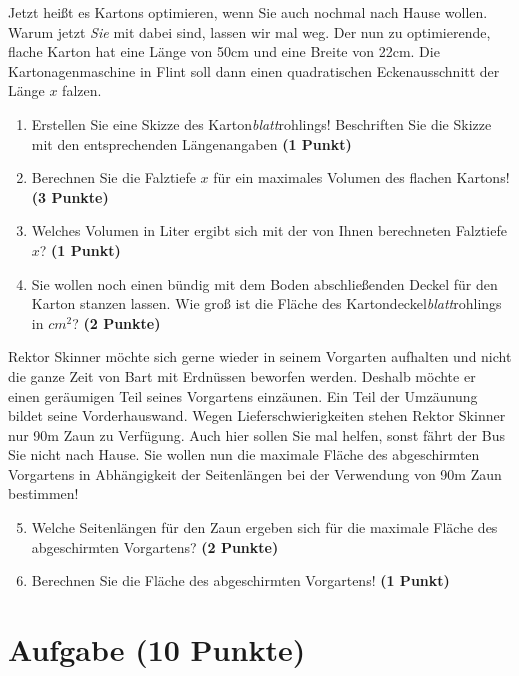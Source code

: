 \documentclass[a4paper, 9pt]{scrartcl}\usepackage[]{graphicx}\usepackage[]{xcolor}
\begin{document}
Jetzt heißt es Kartons optimieren, wenn Sie auch nochmal nach Hause wollen. Warum jetzt \textit{Sie} mit dabei sind, lassen wir mal weg. Der nun zu optimierende, flache Karton hat eine Länge von 50cm und eine Breite von 22cm. Die Kartonagenmaschine in Flint soll dann einen quadratischen Eckenausschnitt der Länge $x$ falzen.

\begin{enumerate}
\item Erstellen Sie eine Skizze des Karton\textit{blatt}rohlings! Beschriften Sie die Skizze mit den entsprechenden Längenangaben \textbf{(1 Punkt)}
\item Berechnen Sie die Falztiefe $x$ für ein maximales Volumen des flachen Kartons! \textbf{(3 Punkte)}
\item Welches Volumen in Liter ergibt sich mit der von Ihnen berechneten Falztiefe $x$?  \textbf{(1 Punkt)}
\item Sie wollen noch einen bündig mit dem Boden abschließenden Deckel für den Karton stanzen lassen. Wie groß ist die Fläche des Kartondeckel\textit{blatt}rohlings in $cm^2$? \textbf{(2 Punkte)}
\end{enumerate}

Rektor Skinner möchte sich gerne wieder in seinem Vorgarten aufhalten und nicht die ganze Zeit von Bart mit Erdnüssen beworfen werden. Deshalb möchte er einen geräumigen Teil seines Vorgartens einzäunen. Ein Teil der Umzäunung bildet seine Vorderhauswand. Wegen Lieferschwierigkeiten stehen Rektor Skinner nur 90m Zaun zu Verfügung. Auch hier sollen Sie mal helfen, sonst fährt der Bus Sie nicht nach Hause. Sie wollen nun die maximale Fläche des abgeschirmten Vorgartens in Abhängigkeit der Seitenlängen bei der Verwendung von 90m Zaun bestimmen!

\begin{enumerate}
  \setcounter{enumi}{4}  
\item  Welche Seitenlängen für den Zaun ergeben sich für die maximale Fläche des abgeschirmten Vorgartens? \textbf{(2 Punkte)}
\item Berechnen Sie die Fläche des abgeschirmten Vorgartens! \textbf{(1 Punkt)}
\end{enumerate}

 
\clearpage

\section{Aufgabe \hfill (10 Punkte)}
\end{document}
